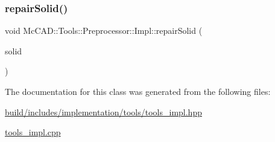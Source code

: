 \subsubsection{\texorpdfstring{repair\+Solid()}{repairSolid()}\hspace{0.1cm}{\footnotesize\ttfamily [2/2]}}
{\footnotesize\ttfamily void Mc\+C\+A\+D\+::\+Tools\+::\+Preprocessor\+::\+Impl\+::repair\+Solid (\begin{DoxyParamCaption}\item[{Topo\+D\+S\+\_\+\+Solid \&}]{solid }\end{DoxyParamCaption})}



The documentation for this class was generated from the following files\+:\begin{DoxyCompactItemize}
\item 
\hyperlink{build_2includes_2implementation_2tools_2tools__impl_8hpp}{build/includes/implementation/tools/tools\+\_\+impl.\+hpp}\item 
\hyperlink{tools__impl_8cpp}{tools\+\_\+impl.\+cpp}\end{DoxyCompactItemize}
